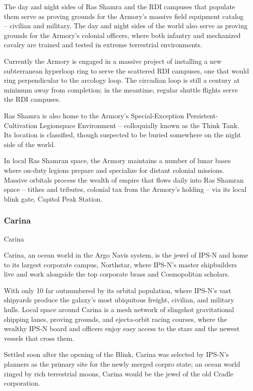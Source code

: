 The day and night sides of Ras Shamra and the RDI campuses that populate them serve as
proving grounds for the Armory’s massive field equipment catalog -- civilian and military. The day
and night sides of the world also serve as proving grounds for the Armory’s colonial officers,
where both infantry and mechanized cavalry are trained and tested in extreme terrestrial
environments.

Currently the Armory is engaged in a massive project of installing a new subterranean hyperloop
ring to serve the scattered RDI campuses, one that would ring perpendicular to the arcology loop.
The circadian loop is still a century at minimum away from completion; in the meantime, regular
shuttle flights serve the RDI campuses.

Ras Shamra is also home to the Armory’s Special-Exception Persistent-Cultivation Legionspace
Environment -- colloquially known as the Think Tank. Its location is classified, though suspected to
be buried somewhere on the night side of the world.

In local Ras Shamran space, the Armory maintains a number of lunar bases where on-duty
legions prepare and specialize for distant colonial missions. Massive orbitals process the wealth
of empire that flows daily into Ras Shamran space -- tithes and tributes, colonial tax from the
Armory’s holding -- via its local blink gate, Capitol Peak Station.

\subsubsection{Carina}
Carina

Carina, an ocean world in the Argo Navis system, is the jewel of IPS-N and home to its largest
corporate campus, Northstar, where IPS-N’s master shipbuilders live and work alongside the top
corporate brass and Cosmopolitan scholars.

With only 10%
far outnumbered by its orbital population, where IPS-N’s vast shipyards produce the galaxy’s most
ubiquitous freight, civilian, and military hulls. Local space around Carina is a mesh network of
slingshot gravitational shipping lanes, proving grounds, and ejecta-orbit racing courses, where the
wealthy IPS-N board and officers enjoy easy access to the stars and the newest vessels that
cross them.

Settled soon after the opening of the Blink, Carina was selected by IPS-N’s planners as the
primary site for the newly merged corpro state; an ocean world ringed by rich terrestrial moons,
Carina would be the jewel of the old Cradle corporation.

